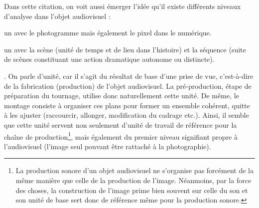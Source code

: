 Dans cette citation, on voit aussi émerger l'idée qu'il existe différents niveaux d'analyse dans l'objet audiovisuel : 
\begin{liste}
	\item un  avec le photogramme mais également le pixel dans le numérique.
	\item un  avec la scène (unité de temps et de lieu dans l'histoire) et la séquence (suite de scènes constituant une action dramatique autonome ou distincte).
	\item {}. 
	On parle d'unité, car il s'agit du résultat de base d'une prise de vue, c'est-à-dire de la fabrication (production) de l'objet audiovisuel. 
	La pré-production, étape de préparation du tournage, utilise donc naturellement cette unité. 
	De même, le montage consiste à organiser ces plans pour former un ensemble cohérent, quitte à les ajuster (raccourcir, allonger, modification du cadrage etc.). 
	Ainsi, il semble que cette unité servent non seulement d'unité de travail de référence pour la chaîne de production\footnote{La production sonore d'un objet audiovisuel ne s'organise pas forcément de la même manière que celle de la production de l'image. Néanmoins, par la force des choses, la construction de l'image prime bien souvent sur celle du son et son unité de base sert donc de référence même pour la production sonore.}, mais également du premier niveau signifiant propre à l'audiovisuel (l'image seul pouvant être rattaché à la photographie).
\end{liste}

